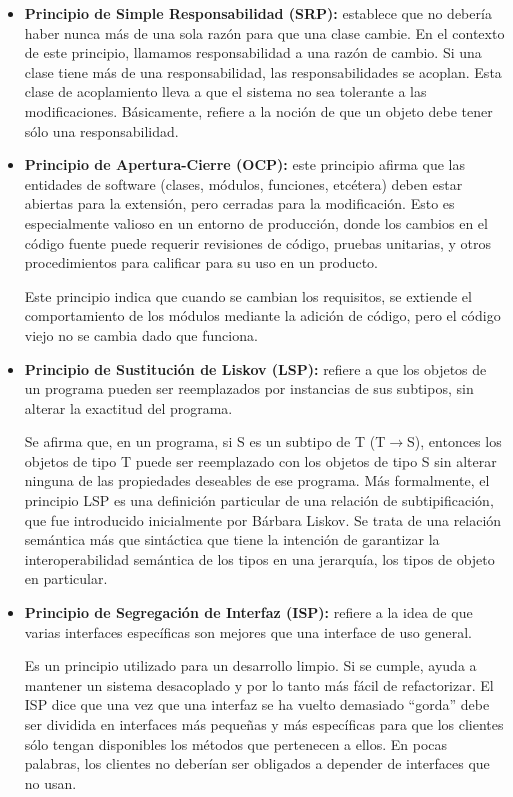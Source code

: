 \begin{itemize}
	\item \textbf{Principio de Simple Responsabilidad (SRP):} establece que no debería haber nunca más de una sola razón para que una clase cambie. En el contexto de este principio, llamamos responsabilidad a una razón de cambio. Si una clase tiene más de una responsabilidad, las responsabilidades se acoplan. Esta clase de acoplamiento lleva a que el sistema no sea tolerante a las modificaciones. Básicamente, refiere a la noción de que un objeto debe tener sólo una responsabilidad.
	
	\item \textbf{Principio de Apertura-Cierre (OCP):} este principio afirma que las entidades de software (clases, módulos, funciones, etcétera) deben estar abiertas para la extensión, pero cerradas para la modificación. Esto es especialmente valioso en un entorno de producción, donde los cambios en el código fuente puede requerir revisiones de código, pruebas unitarias, y otros procedimientos para calificar para su uso en un producto.
	\par Este principio indica que cuando se cambian los requisitos, se extiende el comportamiento de los módulos mediante la adición de código, pero el código viejo no se cambia dado que funciona.

	\item \textbf{Principio de Sustitución de Liskov (LSP):} refiere a que los objetos de un programa pueden ser reemplazados por instancias de sus subtipos, sin alterar la exactitud del programa.
	\par Se afirma que, en un programa, si \textsc{S} es un subtipo de \textsc{T} (\textsc{T}$\to$\textsc{S}), entonces los objetos de tipo \textsc{T} puede ser reemplazado con los objetos de tipo \textsc{S} sin alterar ninguna de las propiedades deseables de ese programa. Más formalmente, el principio LSP es una definición particular de una relación de subtipificación, que fue introducido inicialmente por Bárbara Liskov\cite{liskov}. Se trata de una relación semántica más que sintáctica que tiene la intención de garantizar la interoperabilidad semántica de los tipos en una jerarquía, los tipos de objeto en particular. 

	\item \textbf{Principio de Segregación de Interfaz (ISP):} refiere a la idea de que varias interfaces específicas son mejores que una interface de uso general.
	\par Es un principio utilizado para un desarrollo limpio. Si se cumple, ayuda a mantener un sistema desacoplado y por lo tanto más fácil de refactorizar. El ISP dice que una vez que una interfaz se ha vuelto demasiado ``gorda'' debe ser dividida en interfaces más pequeñas y más específicas para que los clientes sólo tengan disponibles los métodos que pertenecen a ellos. En pocas palabras, los clientes no deberían ser obligados a depender de interfaces que no usan. 


\end{itemize}
